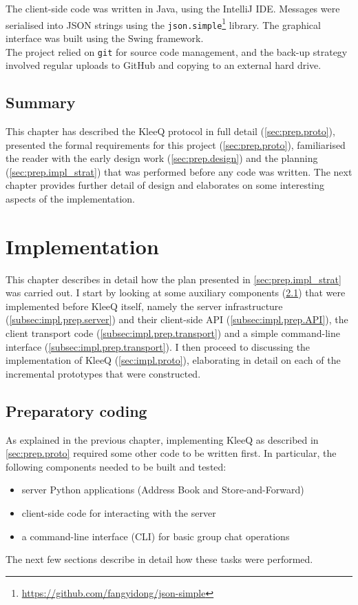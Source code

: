 \documentclass[a4paper, twoside, 12pt]{report}
\newcommand{\skippage}{\cleardoublepage}
\begin{document}
The client-side code was written in Java, using the IntelliJ IDE. Messages were serialised into JSON strings using the \texttt{json.simple}\footnote{\url{https://github.com/fangyidong/json-simple}} library. The graphical interface was built using the Swing framework. \\ 

The project relied on \texttt{git} for source code management, and the back-up strategy involved regular uploads to GitHub and copying to an external hard drive.

\section{Summary}
This chapter has described the KleeQ protocol in full detail (\cref{sec:prep.proto}), presented the formal requirements for this project (\cref{sec:prep.proto}), familiarised the reader with the early design work (\cref{sec:prep.design}) and the planning (\cref{sec:prep.impl_strat}) that was performed before any code was written. The next chapter provides further detail of design and elaborates on some interesting aspects of the implementation.
\restoregeometry

\skippage

\chapter{Implementation}
This chapter describes in detail how the plan presented in \cref{sec:prep.impl_strat} was carried out. I start by looking at some auxiliary components (\cref{sec:impl.prep}) that were implemented before KleeQ itself, namely the server infrastructure (\cref{subsec:impl.prep.server}) and their client-side API (\cref{subsec:impl.prep.API}), the client transport code (\cref{subsec:impl.prep.transport}) and a simple command-line interface (\cref{subsec:impl.prep.transport}). I then proceed to discussing the implementation of KleeQ (\cref{sec:impl.proto}), elaborating in detail on each of the incremental prototypes that were constructed.


\section{Preparatory coding}
\label{sec:impl.prep}
As explained in the previous chapter, implementing KleeQ as described in \cref{sec:prep.proto} required some other code to be written first. In particular, the following components needed to be built and tested:
\begin{itemize}
    \item server Python applications (Address Book and Store-and-Forward)
    \item client-side code for interacting with the server
    \item a command-line interface (CLI) for basic group chat operations
\end{itemize}
The next few sections describe in detail how these tasks were performed.
\end{document}
